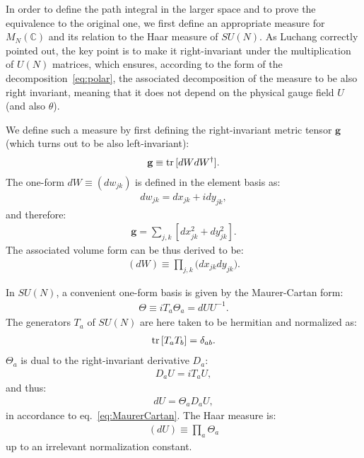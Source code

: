 \documentclass[12pt]{article}
\begin{document}
In order to define the path integral in the larger space
and to prove the equivalence to the original one,
we first define an appropriate measure for $M_N(\mathbb{C})$
and its relation to the Haar measure of $SU(N)$.
As Luchang correctly pointed out,
the key point is to make it right-invariant under
the multiplication of $U(N)$ matrices,
which ensures, according to the form of the decomposition~\eqref{eq:polar},
the associated decomposition of the measure to be also right invariant,
meaning that it does not depend on the physical gauge field $U$
(and also $\theta$).

We define such a measure by
first defining the right-invariant metric tensor $\textbf{g}$
(which turns out to be also left-invariant):
\begin{align}
  \textbf{g}
  \equiv
  {\rm tr}\, [dW dW^\dagger].
\end{align}
The one-form $dW\equiv (dw_{jk})$ is defined in the element basis as:
\begin{align}
  dw_{jk} = dx_{jk} + i dy_{jk},
\end{align}
and therefore:
\begin{align}
  \textbf{g}
  =
  \sum_{j,k}[dx_{jk}^2 + dy_{jk}^2].
\end{align}
The associated volume form can be thus derived to be:
\begin{align}
  (dW)
  \equiv
  \prod_{j,k}
  \big(
  dx_{jk} dy_{jk}
  \big).
  \label{eq:measure_flat}
\end{align}

In $SU(N)$, a convenient one-form basis
is given by the Maurer-Cartan form:
\begin{align}
  \Theta \equiv i T_a \Theta_a = dU U^{-1}. \label{eq:MaurerCartan}
\end{align}
The generators $T_a$ of $SU(N)$ are here taken to be hermitian and normalized as:
\begin{align}
  {\rm tr}\,[T_a T_b] = \delta_{ab}.
\end{align}
$\Theta_a$ is dual to the right-invariant derivative $D_a$:
\begin{align}
  D_a U = i T_a U,
\end{align}
and thus:
\begin{align}
  dU = \Theta_a D_a U,
\end{align}
in accordance to eq.~\eqref{eq:MaurerCartan}.
The Haar measure is:
\begin{align}
  (dU) \equiv \prod_a \Theta_a
\end{align}
up to an irrelevant normalization constant.
\end{document}
